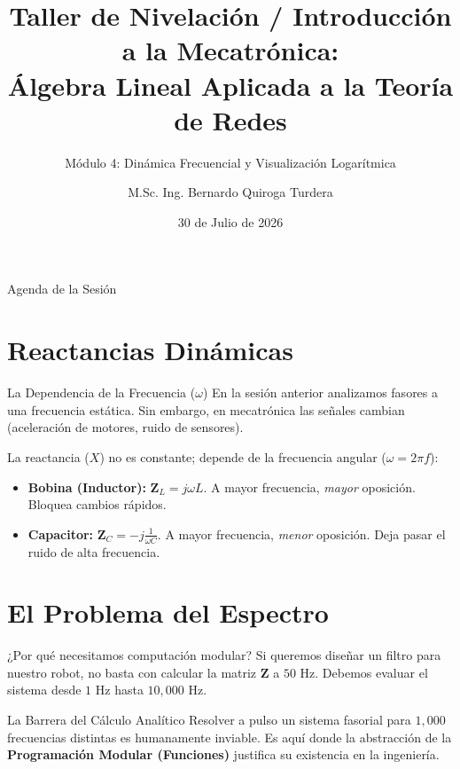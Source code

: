 \documentclass[aspectratio=169]{beamer}
\title[Nivelación - Sesión 3]{Taller de Nivelación / Introducción a la Mecatrónica:\\ Álgebra Lineal Aplicada a la Teoría de Redes}
\subtitle{Módulo 4: Dinámica Frecuencial y Visualización Logarítmica}
\author[M.Sc. Ing. B. Quiroga Turdera]{M.Sc. Ing. Bernardo Quiroga Turdera}
\institute[UCB Tarija]{Carrera de Ingeniería Mecatrónica\\ Universidad Católica Boliviana "San Pablo"}
\date{30 de Julio de 2026}
\begin{document}
\begin{frame}
    \titlepage
\end{frame}

\begin{frame}{Agenda de la Sesión}
    \tableofcontents
\end{frame}

\section{Reactancias Dinámicas}
\begin{frame}{La Dependencia de la Frecuencia ($\omega$)}
    En la sesión anterior analizamos fasores a una frecuencia estática. Sin embargo, en mecatrónica las señales cambian (aceleración de motores, ruido de sensores).
    
    La reactancia ($X$) no es constante; depende de la frecuencia angular ($\omega = 2\pi f$):
    \vspace{0.3cm}
    \begin{itemize}
        \item \textbf{Bobina (Inductor):} $\mathbf{Z}_L = j\omega L$. A mayor frecuencia, \textit{mayor} oposición. Bloquea cambios rápidos.
        \item \textbf{Capacitor:} $\mathbf{Z}_C = -j\frac{1}{\omega C}$. A mayor frecuencia, \textit{menor} oposición. Deja pasar el ruido de alta frecuencia.
    \end{itemize}
\end{frame}

\section{El Problema del Espectro}
\begin{frame}{¿Por qué necesitamos computación modular?}
    Si queremos diseñar un filtro para nuestro robot, no basta con calcular la matriz $\mathbf{Z}$ a $50\text{ Hz}$. Debemos evaluar el sistema desde $1\text{ Hz}$ hasta $10,000\text{ Hz}$.
    
    \vspace{0.3cm}
    \begin{alertblock}{La Barrera del Cálculo Analítico}
    Resolver a pulso un sistema fasorial para $1,000$ frecuencias distintas es humanamente inviable. Es aquí donde la abstracción de la \textbf{Programación Modular (Funciones)} justifica su existencia en la ingeniería.
    \end{alertblock}
\end{frame}
\end{document}
